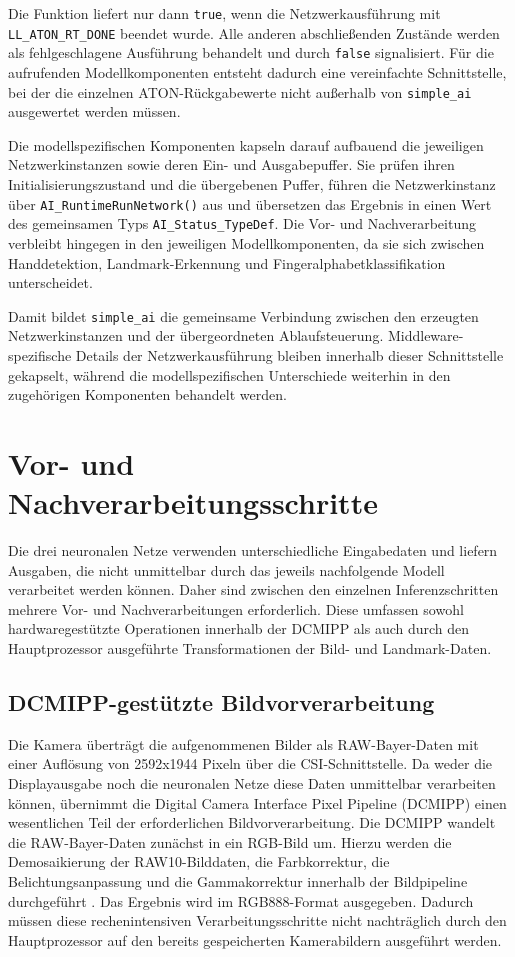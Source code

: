 Die Funktion liefert nur dann \texttt{true}, wenn die Netzwerkausführung mit \texttt{LL\_ATON\_RT\_DONE} beendet wurde. Alle anderen abschließenden Zustände werden als fehlgeschlagene Ausführung behandelt und durch \texttt{false} signalisiert. Für die aufrufenden Modellkomponenten entsteht dadurch eine vereinfachte Schnittstelle, bei der die einzelnen ATON-Rückgabewerte nicht außerhalb von \texttt{simple\_ai} ausgewertet werden müssen.

Die modellspezifischen Komponenten kapseln darauf aufbauend die jeweiligen Netzwerkinstanzen sowie deren Ein- und Ausgabepuffer. Sie prüfen ihren Initialisierungszustand und die übergebenen Puffer, führen die Netzwerkinstanz über \texttt{AI\_RuntimeRunNetwork()} aus und übersetzen das Ergebnis in einen Wert des gemeinsamen Typs \texttt{AI\_Status\_TypeDef}. Die Vor- und Nachverarbeitung verbleibt hingegen in den jeweiligen Modellkomponenten, da sie sich zwischen Handdetektion, Landmark-Erkennung und Fingeralphabetklassifikation unterscheidet.

Damit bildet \texttt{simple\_ai} die gemeinsame Verbindung zwischen den erzeugten Netzwerkinstanzen und der übergeordneten Ablaufsteuerung. Middleware-spezifische Details der Netzwerkausführung bleiben innerhalb dieser Schnittstelle gekapselt, während die modellspezifischen Unterschiede weiterhin in den zugehörigen Komponenten behandelt werden.

\section{Vor- und Nachverarbeitungsschritte}\label{sec:vor-nachverarbeitung}

Die drei neuronalen Netze verwenden unterschiedliche Eingabedaten und liefern Ausgaben, die nicht unmittelbar durch das jeweils nachfolgende Modell verarbeitet werden können. Daher sind zwischen den einzelnen Inferenzschritten mehrere Vor- und Nachverarbeitungen erforderlich. Diese umfassen sowohl hardwaregestützte Operationen innerhalb der DCMIPP als auch durch den Hauptprozessor ausgeführte Transformationen der Bild- und Landmark-Daten.

\subsection{DCMIPP-gestützte Bildvorverarbeitung}\label{sub:dcmipp-vorverarbeitung}

Die Kamera überträgt die aufgenommenen Bilder als RAW-Bayer-Daten mit einer Auflösung von 2592x1944 Pixeln über die CSI-Schnittstelle. Da weder die Displayausgabe noch die neuronalen Netze diese Daten unmittelbar verarbeiten können, übernimmt die Digital Camera Interface Pixel Pipeline (DCMIPP) einen wesentlichen Teil der erforderlichen Bildvorverarbeitung. Die DCMIPP wandelt die RAW-Bayer-Daten zunächst in ein RGB-Bild um. Hierzu werden die Demosaikierung der RAW10-Bilddaten, die Farbkorrektur, die Belichtungsanpassung und die Gammakorrektur innerhalb der Bildpipeline durchgeführt \cite[S. 1815 ff.]{rm0486}. Das Ergebnis wird im RGB888-Format ausgegeben. Dadurch müssen diese rechenintensiven Verarbeitungsschritte nicht nachträglich durch den Hauptprozessor auf den bereits gespeicherten Kamerabildern ausgeführt werden.

